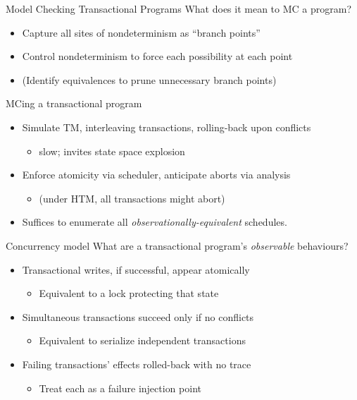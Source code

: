 \documentclass[xcolor=dvipsnames]{beamer}
\begin{document}
\begin{frame}{Model Checking Transactional Programs}
	What does it mean to MC a program?
	\begin{itemize}
		\item Capture all sites of nondeterminism as ``branch points'' %
		\item Control nondeterminism to force each possibility at each point
		\item (Identify equivalences to prune unnecessary branch points)
	\end{itemize}
	\pause
	\linegap

	MCing a transactional program
	\begin{itemize}
		\item Simulate TM, interleaving transactions, rolling-back upon conflicts
			\begin{itemize}
				\item slow; invites state space explosion
			\end{itemize}
		\item Enforce atomicity via scheduler, anticipate aborts via analysis
			\begin{itemize}
				\item (under HTM, all transactions might abort)
			\end{itemize}
		\item Suffices to enumerate all {\em observationally-equivalent} schedules.
	\end{itemize}
\end{frame}

\begin{frame}{Concurrency model}
	What are a transactional program's {\em observable} behaviours?
	\begin{itemize}
		\item Transactional writes, if successful, appear atomically %
		\begin{itemize}
			\item Equivalent to a lock protecting that state
		\end{itemize}
			\pause
		\item Simultaneous transactions succeed only if no conflicts
		\begin{itemize}
			\item Equivalent
				to serialize independent transactions
		\end{itemize}
			\pause
		\item Failing transactions' effects rolled-back with no trace
		\begin{itemize}
			\item Treat each \xbegin as a failure injection point
		\end{itemize}
	\end{itemize}
\end{frame}
\end{document}
